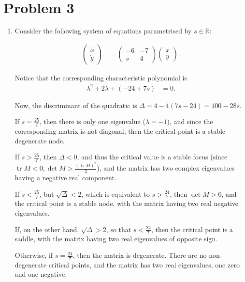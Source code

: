 \documentclass[12pt,letterpaper]{article}
\DeclareMathOperator{\Tr}{tr}
\begin{document}
\section*{Problem 3}
\begin{enumerate}[label=(\alph*)]
	\item
	      Consider the following system of equations parametrised by $s \in \mathbb{R}$:

	      \begin{align}
		      \begin{pmatrix}
			      \dot{x} \\
			      \dot{y}
		      \end{pmatrix} & =
		      \begin{pmatrix}
			      -6 & -7 \\
			      s  & 4
		      \end{pmatrix}
		      \begin{pmatrix}
			      x \\
			      y
		      \end{pmatrix}.
	      \end{align}

	      Notice that the corresponding characteristic polynomial is
	      \begin{align}
		      \lambda^2 +  2\lambda + (-24 + 7s) & = 0.
	      \end{align}

	      Now, the discriminant of the quadratic is $\Delta = 4  -4 (7s -24) = 100 - 28s$.

	      If $s = \frac{25}{7}$, then there is only one eigenvalue ($\lambda = -1$), and since the corresponding matrix is not diagonal, then the critical point is a stable degenerate node.

	      If $s > \frac{25}{7}$, then $\Delta < 0$, and thus the critical value is a stable focus (since $\Tr M < 0, \det M > \frac{(\Tr M)^2} {2}$), and the matrix has two complex eigenvalues having a negative real component.

	      If $s< \frac{25}{7}$, but $\sqrt{\Delta} < 2$, which is equivalent to $s > \frac{24}{7}$, then $\det M > 0$, and the critical  point is a stable node, with the matrix having two  real negative eigenvalues.

	      If, on the other hand, $\sqrt{\Delta} > 2$, so that $s < \frac{24}{7}$, then the critical point is a saddle, with the matrix having two real eigenvalues of opposite sign.

	      Otherwise, if $s = \frac{24}{7}$, then the matrix is degenerate. There are no non-degenerate critical points, and the matrix has two real eigenvalues, one zero and one negative.



\end{enumerate}
\end{document}
